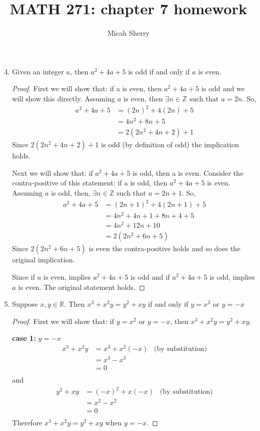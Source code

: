 \documentclass{article}
\title{MATH 271: chapter 7 homework}
\author{Micah Sherry}
\newcommand{\ints}{\mathbb{Z}}
\newcommand{\reals}{\mathbb{R}}
\newcommand{\st}{\text{ such that }}
\begin{document}
	\maketitle
	
	\begin{enumerate}
		\setcounter{enumi}{3}
		\item Given an integer $a$, then $a^2 +4a+5$ is odd if and only if $a$ is even.
		\begin{proof}
			First we will show that: if a is even, then $a^2 +4a+5$ is odd and we will show this directly.
			Assuming $a$ is even, then $\exists n \in \ints \st a=2n$. 
			So, 
			\begin{align*}
				a^2 + 4a + 5 &= (2n)^2 + 4(2n) + 5\\
					 &= 4n^2 + 8n + 5\\
					 &= 2(2n^2 + 4n + 2) + 1
			\end{align*}
			 Since  $2(2n^2 + 4n + 2) + 1$ is odd (by definition of odd) the implication holds.
			 
			 Next we will show that: 
			 	if $a^2 +4a+5$ is odd, then a is even.
			  Consider the contra-positive of this statement: 
			  	if a is odd, then $a^2 +4a+5$ is even.
			  Assuming $a$ is odd, then, $\exists n \in \ints \st a=2n+1$. 
			  So, 
			  \begin{align*}
			  	a^2 + 4a + 5 &= (2n+1)^2 + 4(2n+1) + 5\\
			  		&=  4n^2+4n+1 +8n + 4 + 5\\
			  		&=  4n^2+12n +10\\
			  		&=  2(2n^2+6n +5)
			  \end{align*}
			  Since $2(2n^2+6n +5)$ is even the contra-positive holds and so does the original implication.
			  
			Since if $a$ is even, implies $a^2 +4a+5$ is odd and if $a^2 +4a+5$ is odd, implies $a$ is even. The original statement holds.
			  
			
		\end{proof}
		
		\setcounter{enumi}{5}
		\item Suppose $x, y \in \reals $. Then  $x^3 + x^2y=y^2 +xy$ if and only if $y = x^2 $ or $y = -x$ 
		\begin{proof}
			First we will show that: if $y = x^2$ or $y = -x$, then $x^3 + x^2y=y^2 +xy$.
			
			\textbf{case 1:} $y = -x$ \\ 
			\begin{align*}
				x^3+x^2y &= x^3 + x^2(-x) & \text{(by substitution)}\\
						 &=  x^3 - x^3 \\
						 &= 0\\
			\end{align*}
			and
			\begin{align*}
				y^2 +xy&= (-x)^2+x(-x) & \text{(by substitution)}\\
				&=  x^2 - x^2 \\
				&= 0\\
			\end{align*}
			Therefore $x^3+x^2y = y^2 +xy$ when $y = -x$.
			

\end{proof}
\end{enumerate}
\end{document}
